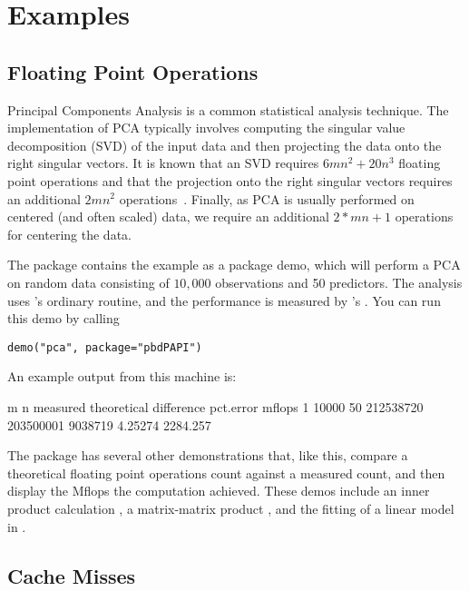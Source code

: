 \section{Examples}
\label{sec:examples}


\subsection{Floating Point Operations}

Principal Components Analysis is a common statistical analysis technique.  The 
implementation of PCA typically involves computing the singular value 
decomposition (SVD) of the input data and then projecting the data onto the 
right singular vectors.  It is known that an SVD requires $6mn^2 + 20n^3$ 
floating point operations and that the projection onto the right singular 
vectors requires an additional $2mn^2$ operations~\citep{gvl}.  Finally, as PCA 
is usually performed on centered (and often scaled) data, we require an 
additional $2*mn+1$ operations for centering the data.

The \thispackage package contains the example  as a package demo, 
which will perform a PCA on random data consisting of $10,000$ observations and 
50 predictors.  The analysis uses \R's ordinary  routine, and 
the performance is measured by \thispackage's .  You can 
run this demo by calling

\begin{lstlisting}[language=rr]
demo("pca", package="pbdPAPI")
\end{lstlisting}


An example output from this machine is:

\begin{Output}
      m  n  measured theoretical difference pct.error   mflops
1 10000 50 212538720   203500001    9038719   4.25274 2284.257
\end{Output}

The \thispackage package has several other demonstrations that, like this, 
compare a theoretical floating point operations count against a measured count, 
and then display the Mflops the computation achieved.  These demos include 
an inner product calculation , a matrix-matrix product 
, and the fitting of a linear model in .


\subsection{Cache Misses}

